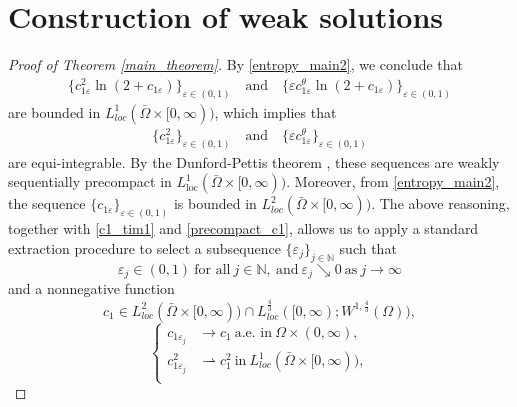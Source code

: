 \documentclass[a4paper,10pt]{article}
\theoremstyle{definition}
\begin{document}
\section{Construction of weak solutions}\label{sec:limits}


\begin{proof}[Proof of Theorem \ref{main_theorem}]
By \eqref{entropy_main2}, we conclude that
\begin{align*}
\{c_{1\varepsilon}^2 \ln (2 + c_{1\varepsilon})\}_{\varepsilon \in (0, 1)} \quad \text{and} \quad
\{\varepsilon c_{1\varepsilon}^\theta \ln (2 + c_{1\varepsilon})\}_{\varepsilon \in (0, 1)}
\end{align*}
are bounded in $L^1_{loc}(\bar{\Omega} \times [0, \infty))$, which implies that
\begin{align*}
  \{c_{1\varepsilon}^2\}_{\varepsilon \in (0, 1)} \quad \text{and} \quad
\{\varepsilon c_{1\varepsilon}^\theta\}_{\varepsilon \in (0, 1)}
\end{align*}
are equi-integrable. By the Dunford-Pettis theorem \cite[A8.14]{alt2016linear}, these sequences are weakly sequentially precompact in $L^1_{\mathrm{loc}}(\bar{\Omega} \times [0, \infty))$. Moreover, from \eqref{entropy_main2}, the sequence $\{c_{1\varepsilon}\}_{\varepsilon \in (0, 1)}$ is bounded in $L^2_{loc}(\bar{\Omega} \times [0, \infty))$. The above reasoning, together with \eqref{c1_tim1} and \eqref{precompact_c1}, allows us to apply a standard extraction procedure to select a subsequence $\{\varepsilon_j\}_{j \in \mathbb{N}}$ such that
\begin{equation*}
  \varepsilon_j \in (0, 1) ~\text{for all}~ j \in \mathbb{N}, ~\text{and}~ \varepsilon_j \searrow 0 ~\text{as}~ j \to \infty
\end{equation*}
and a nonnegative function
\begin{equation*}
\label{th3c1_main}
c_1 \in L^2_{loc}(\bar{\Omega} \times [0, \infty)) \cap L_{loc}^{\frac{4}{3}}([0, \infty) ; W^{1, \frac{4}{3}}(\Omega)),
\end{equation*}
\begin{equation}
\begin{cases}
 \label{mth1}
  c_{1\varepsilon_j} & \to c_1 ~\text{a.e. in}~ \Omega \times (0, \infty),                                                                          \\[5pt]
  c_{1\varepsilon_j}^2 & \rightharpoonup c_1^2 ~\text{in}~ L^1_{loc}(\bar{\Omega} \times [0, \infty)),                                              \\[5pt]

\end{cases}
\end{equation}
\end{proof}
\end{document}
